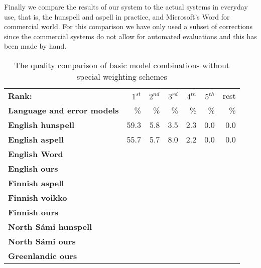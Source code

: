 \documentclass[a4paper,12pt]{article}
\begin{document}
%

Finally we compare the results of our system to the actual systems in everyday
use, that is, the hunspell and aspell in practice, and Microsoft's Word for
commercial world. For this comparison we have only used a subset of corrections
since the commercial systems do not allow for automated evaluations and
this has been made by hand. 

\begin{table}
    \centering
    \begin{tabular}{|l|r|r|r|r|r|r|}
        \hline
        \bf Rank: & $1^{st}$ & $2^{nd}$ & $3^{rd}$ & $4^{th}$ & $5^{th}$ & rest \\
        \bf Language and error models &  \% & \% & \% & \% & \% & \% \\
        \hline
        \bf English hunspell & 59.3 & 5.8 & 3.5 & 2.3 & 0.0 & 0.0 \\
          \bf English aspell & 55.7 & 5.7 & 8.0 & 2.2 & 0.0 & 0.0 \\
            \bf English Word & & & & & &  \\
            \bf English ours & & & & & & \\
        \hline
        \bf Finnish aspell & & & & & & \\
        \bf Finnish voikko & & & & & & \\
          \bf Finnish ours & & & & & & \\
        \hline
        \bf North Sámi hunspell & & & & & & \\
            \bf North Sámi ours & & & & & & \\
        \hline
        \bf Greenlandic ours & & & & & & \\
        \hline
    \end{tabular}
    \caption{The quality comparison of basic model combinations without special
    weighting schemes\label{table:commercial-quality}}
\end{table}
\end{document}
